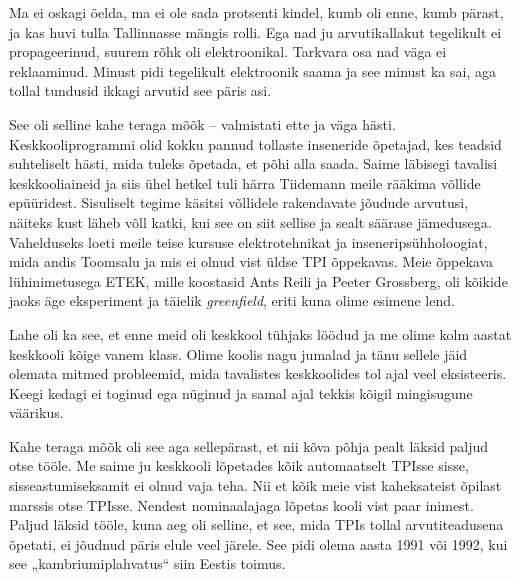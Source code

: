 
Ma ei oskagi öelda, ma ei ole sada protsenti kindel, kumb oli enne, kumb 
pärast, ja kas huvi tulla Tallinnasse mängis rolli. Ega nad ju 
arvutikallakut tegelikult ei propageerinud, suurem rõhk oli elektroonikal. 
Tarkvara osa nad väga ei reklaaminud. Minust pidi tegelikult elektroonik saama 
ja see minust ka sai, aga tollal tundusid ikkagi arvutid 
see päris asi. 


See oli selline kahe teraga mõõk – valmistati ette ja 
väga hästi. Keskkooliprogrammi olid kokku pannud 
tollaste inseneride õpetajad, kes teadsid suhteliselt hästi, mida tuleks 
õpetada, et põhi alla saada. Saime 
läbisegi tavalisi keskkooliaineid ja siis ühel hetkel tuli härra 
Tiidemann meile rääkima võllide 
epüüridest. Sisuliselt tegime käsitsi võllidele 
rakendavate jõudude arvutusi, näiteks kust läheb võll katki, kui see on siit
sellise ja sealt säärase jämedusega. Vahelduseks loeti meile 
teise kursuse elektrotehnikat ja 
inseneripsühholoogiat, mida andis Toomsalu ja mis ei 
olnud vist üldse TPI õppekavas. Meie õppekava lühinimetusega ETEK, 
mille koostasid Ants Reili ja 
Peeter Grossberg, oli kõikide jaoks äge 
eksperiment ja täielik \emph{greenfield}, eriti kuna 
olime esimene lend. 

Lahe oli ka see, et enne meid oli keskkool tühjaks löödud ja me olime kolm 
aastat keskkooli kõige 
vanem klass. Olime koolis nagu jumalad ja 
tänu sellele jäid olemata mitmed probleemid, mida tavalistes 
keskkoolides tol ajal veel eksisteeris. Keegi kedagi ei toginud ega 
nüginud ja samal ajal tekkis kõigil mingisugune väärikus. 

Kahe teraga mõõk oli see aga sellepärast, et nii kõva põhja pealt läksid paljud 
otse tööle. Me saime ju keskkooli lõpetades kõik  
automaatselt TPIsse sisse, sisseastumiseksamit ei olnud vaja teha. Nii et kõik 
meie vist kaheksateist õpilast marssis otse TPIsse. Nendest 
nominaalajaga lõpetas kooli vist paar inimest. Paljud läksid tööle, kuna aeg 
oli 
selline, et see, mida TPIs tollal arvutiteadusena õpetati, ei jõudnud 
päris elule veel järele. See pidi olema aasta 1991 või 1992, kui 
see „kambriumiplahvatus“ siin Eestis toimus.

